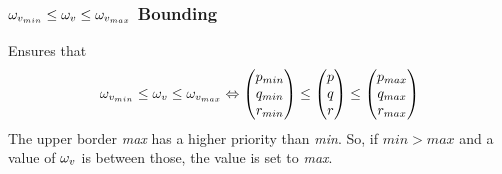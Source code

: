 \subsubsection*{$\omega_{v_{min}} \leq \omega_{v} \leq \omega_{v_{max}}$ Bounding}
Ensures that
\begin{equation}
\omega_{v_{min}} \leq \omega_{v} \leq \omega_{v_{max}} \Leftrightarrow \begin{pmatrix} p_{min} \\ q_{min} \\ r_{min} \end{pmatrix} \leq \begin{pmatrix} p \\ q \\ r \end{pmatrix} \leq \begin{pmatrix} p_{max} \\ q_{max} \\ r_{max} \end{pmatrix}
\end{equation}
The upper border \textit{max} has a higher priority than \textit{min}. So, if $ min > max$ and a value of $ \omega_{v} $ is between those, the value is set to \textit{max}. \\
